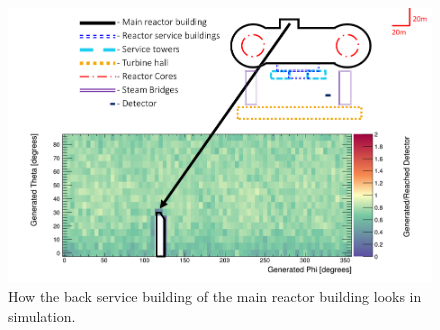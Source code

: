 
\newpage
\begin{figure}[htbp]
  \centering
  \begin{turn}{-90}
  \begin{minipage}{9in}
  \centering
    \includegraphics[scale = 0.8]{Chapter5/Figs/wylfaRasterNew/backServiceGen_Reached.png}
  \caption{How the back service building of the main reactor building looks in simulation.}
  \label{fig:backServiceGen_Reached}
  \end{minipage}
  \end{turn}
\end{figure}


